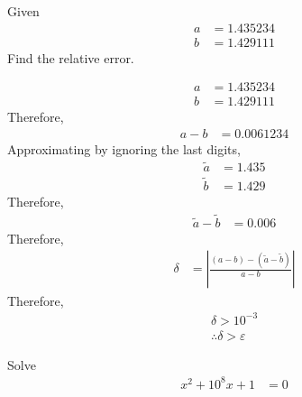 \documentclass[fleqn, a4paper, 12pt, twoside]{article}
\theoremstyle{definition}
\theoremstyle{theorem}
\renewcommand{\tilde}{\widetilde}
\begin{document}
\begin{question}
	Given
	\begin{align*}
		a & = 1.435234 \\
		b & = 1.429111
	\end{align*}
	Find the relative error.
\end{question}

\begin{solution}
	\begin{align*}
		a & = 1.435234 \\
		b & = 1.429111
	\end{align*}
	Therefore,
	\begin{align*}
		a - b & = 0.0061234
	\end{align*}
	Approximating by ignoring the last digits,
	\begin{align*}
		\tilde{a} & = 1.435 \\
		\tilde{b} & = 1.429
	\end{align*}
	Therefore,
	\begin{align*}
		\tilde{a} - \tilde{b} & = 0.006
	\end{align*}
	Therefore,
	\begin{align*}
		\delta & = \left| \frac{\left( a - b \right) - \left( \tilde{a} - \tilde{b} \right)}{a - b} \right|
	\end{align*}
	Therefore,
	\begin{align*}
		\delta > 10^{-3} \\
		\therefore \delta > \varepsilon
	\end{align*}
\end{solution}

\begin{question}
	Solve
	\begin{align*}
		x^2 + 10^8 x + 1 & = 0
	\end{align*}
\end{question}
\end{document}
